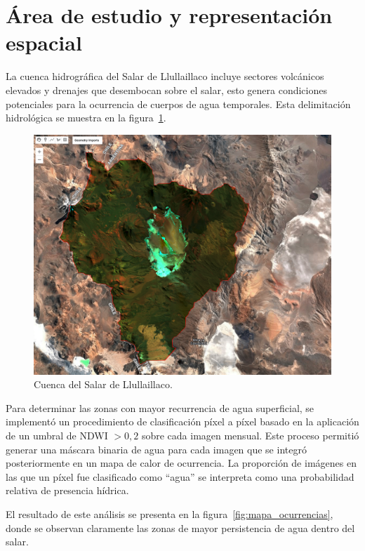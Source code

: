 \section{Área de estudio y representación espacial}

La cuenca hidrográfica del  Salar de Llullaillaco incluye sectores volcánicos elevados y drenajes que desembocan sobre el salar, esto genera condiciones potenciales para la ocurrencia de cuerpos de agua temporales. Esta delimitación hidrológica se muestra en la figura~\ref{fig:cuenca_llullaillaco}.


\begin{figure}[htpb]
	\centering
	\includegraphics[scale=.3]{Figures/fig5.png}
	\caption{Cuenca del Salar de Llullaillaco.}
	\label{fig:cuenca_llullaillaco}
\end{figure}

Para determinar las zonas con mayor recurrencia de agua superficial, se implementó un procedimiento de clasificación píxel a píxel basado en la aplicación de un umbral de NDWI $>0{,}2$ sobre cada imagen mensual. Este proceso permitió generar una máscara binaria de agua para cada imagen que se integró posteriormente en un mapa de calor de ocurrencia. La proporción de imágenes en las que un píxel fue clasificado como “agua” se interpreta como una probabilidad relativa de presencia hídrica.

El resultado de este análisis se presenta en la figura~\ref{fig:mapa_ocurrencias}, donde se observan claramente las zonas de mayor persistencia de agua dentro del salar.


